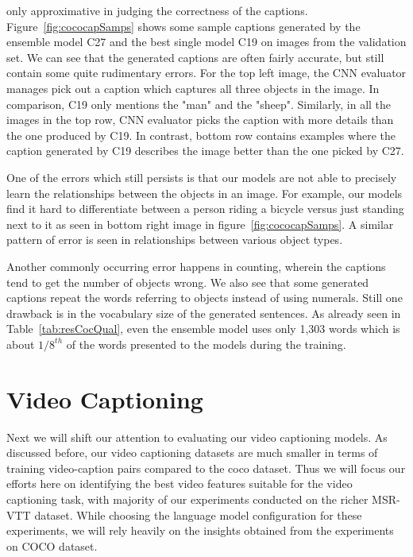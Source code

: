 only approximative in judging the correctness of the captions.
Figure~\ref{fig:cococapSamps} shows some sample captions generated by the
ensemble model C27 and the best single model C19 on images from the validation
set.
We can see that the generated captions are often fairly accurate, but still
contain some quite rudimentary errors.
For the top left image, the CNN evaluator manages pick out a caption which
captures all three objects in the image.
In comparison, C19 only mentions the "man" and the "sheep".
Similarly, in all the images in the top row, CNN evaluator picks the caption
with more details than the one produced by C19.
In contrast, bottom row contains examples where the caption generated by C19
describes the image better than the one picked by C27.

One of the errors which still persists is that our models are not able to
precisely learn the relationships between the objects in an image.
For example, our models find it hard to differentiate between a person riding a
bicycle versus just standing next to it as seen in bottom right image in
figure~\ref{fig:cococapSamps}.
A similar pattern of error is seen in relationships between various object
types.

Another commonly occurring error happens in counting, wherein the captions tend
to get the number of objects wrong.
We also see that some generated captions repeat the words referring to objects
instead of using numerals.
Still one drawback is in the vocabulary size of the generated sentences.
As already seen in Table~\ref{tab:resCocQual}, even the ensemble model uses only
1,303 words which is about $1/8^{th}$ of the words presented to the models
during the training.

\section{Video Captioning}
Next we will shift our attention to evaluating our video captioning models.
As discussed before, our video captioning datasets are much smaller in terms of
training video-caption pairs compared to the coco dataset.
Thus we will focus our efforts here on identifying the best video features
suitable for the video captioning task, with majority of our experiments
conducted on the richer MSR-VTT dataset.
While choosing the language model configuration for these experiments, we will
rely heavily on the insights obtained from the experiments on COCO dataset.

